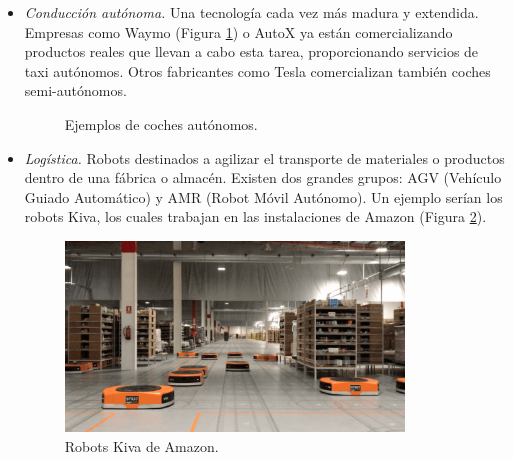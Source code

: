\begin{itemize}
\item \textit{Conducción autónoma.} Una tecnología cada vez más madura y extendida. Empresas como Waymo (Figura \ref{fig:coches_autonomos}) o AutoX ya están comercializando productos reales que llevan a cabo esta tarea, proporcionando servicios de taxi autónomos. Otros fabricantes como Tesla comercializan también coches semi-autónomos.\\

\begin{figure}[h!]
  \begin{center}
    \subcapcentertrue
    \hspace{2mm}
  \end{center}
\caption{Ejemplos de coches autónomos.}
\label{fig:coches_autonomos}
\end{figure}

\item \textit{Logística.} Robots destinados a agilizar el transporte de materiales o productos dentro de una fábrica o almacén. Existen dos grandes grupos: AGV (Vehículo Guiado Automático) y AMR (Robot Móvil Autónomo). Un ejemplo serían los robots Kiva, los cuales trabajan en las instalaciones de Amazon (Figura \ref{fig:kiva}).

\begin{figure} [h!]
  \begin{center}
    \includegraphics[width=90mm]{figs/amazon_kiva.png}
  \end{center}
  \caption{Robots Kiva de Amazon.}
  \label{fig:kiva}
\end{figure}


\end{itemize}
